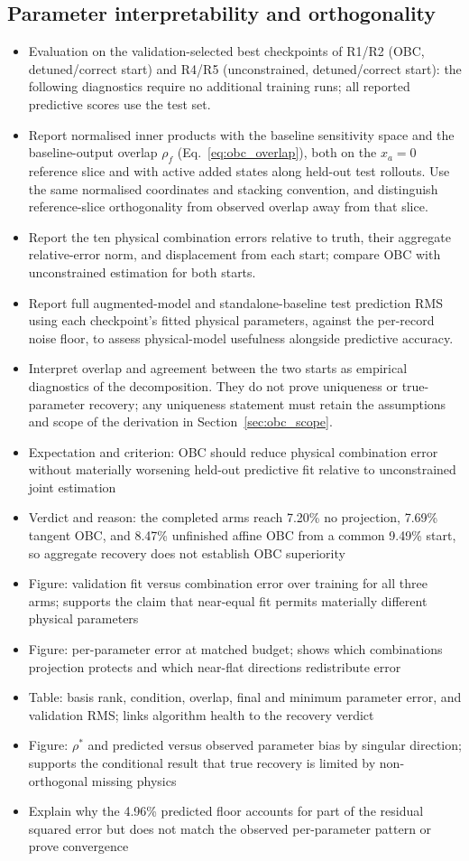 \subsection{Parameter interpretability and orthogonality}
\begin{itemize}
\item Evaluation on the validation-selected best checkpoints of R1/R2 (OBC, detuned/correct start) and R4/R5 (unconstrained, detuned/correct start): the following diagnostics require no additional training runs; all reported predictive scores use the test set.
\item Report normalised inner products with the baseline sensitivity space and the baseline-output overlap $\rho_f$ (Eq.~\eqref{eq:obc_overlap}), both on the $x_a=0$ reference slice and with active added states along held-out test rollouts. Use the same normalised coordinates and stacking convention, and distinguish reference-slice orthogonality from observed overlap away from that slice.
\item Report the ten physical combination errors relative to truth, their aggregate relative-error norm, and displacement from each start; compare OBC with unconstrained estimation for both starts.
\item Report full augmented-model and standalone-baseline test prediction RMS using each checkpoint's fitted physical parameters, against the per-record noise floor, to assess physical-model usefulness alongside predictive accuracy.
\item Interpret overlap and agreement between the two starts as empirical diagnostics of the decomposition. They do not prove uniqueness or true-parameter recovery; any uniqueness statement must retain the assumptions and scope of the derivation in Section~\ref{sec:obc_scope}.
\item Expectation and criterion: OBC should reduce physical combination error without materially worsening held-out predictive fit relative to unconstrained joint estimation
\item Verdict and reason: the completed arms reach 7.20\% no projection, 7.69\% tangent OBC, and 8.47\% unfinished affine OBC from a common 9.49\% start, so aggregate recovery does not establish OBC superiority
\item Figure: validation fit versus combination error over training for all three arms; supports the claim that near-equal fit permits materially different physical parameters
\item Figure: per-parameter error at matched budget; shows which combinations projection protects and which near-flat directions redistribute error
\item Table: basis rank, condition, overlap, final and minimum parameter error, and validation RMS; links algorithm health to the recovery verdict
\item Figure: $\rho^*$ and predicted versus observed parameter bias by singular direction; supports the conditional result that true recovery is limited by non-orthogonal missing physics
\item Explain why the 4.96\% predicted floor accounts for part of the residual squared error but does not match the observed per-parameter pattern or prove convergence
\end{itemize}
